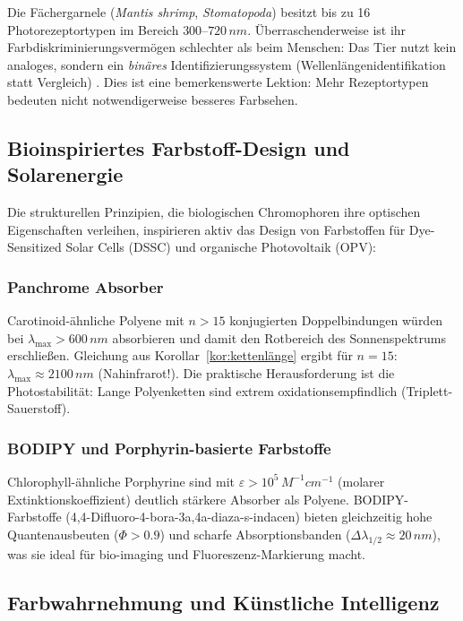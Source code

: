 ﻿\documentclass[a4paper,12pt]{article}
\theoremstyle{definition}
\begin{document}
Die Fächergarnele (\textit{Mantis shrimp}, \textit{Stomatopoda}) besitzt
bis zu 16 Photorezeptortypen im Bereich $300$--$720\,\si{nm}$.
Überraschenderweise ist ihr Farbdiskriminierungsvermögen schlechter
als beim Menschen: Das Tier nutzt kein analoges, sondern ein \emph{binäres}
Identifizierungssystem (Wellenlängenidentifikation statt Vergleich) \cite{thoen2014}.
Dies ist eine bemerkenswerte Lektion: Mehr Rezeptortypen bedeuten nicht
notwendigerweise besseres Farbsehen.

\subsection{Bioinspiriertes Farbstoff-Design und Solarenergie}

Die strukturellen Prinzipien, die biologischen Chromophoren ihre optischen
Eigenschaften verleihen, inspirieren aktiv das Design von Farbstoffen für
Dye-Sensitized Solar Cells (DSSC) und organische Photovoltaik (OPV):

\subsubsection{Panchrome Absorber}

Carotinoid-ähnliche Polyene mit $n > 15$ konjugierten Doppelbindungen
würden bei $\lambda_{\max} > 600\,\si{nm}$ absorbieren und damit den Rotbereich
des Sonnenspektrums erschließen. Gleichung aus Korollar~\ref{kor:kettenlänge}
ergibt für $n=15$: $\lambda_{\max} \approx 2100\,\si{nm}$ (Nahinfrarot!).
Die praktische Herausforderung ist die Photostabilität: Lange Polyenketten
sind extrem oxidationsempfindlich (Triplett-Sauerstoff).

\subsubsection{BODIPY und Porphyrin-basierte Farbstoffe}

Chlorophyll-ähnliche Porphyrine sind mit $\varepsilon > 10^5\,\si{M^{-1}cm^{-1}}$
(molarer Extinktionskoeffizient) deutlich stärkere Absorber als Polyene.
BODIPY-Farbstoffe (4,4-Difluoro-4-bora-3a,4a-diaza-s-indacen) bieten
gleichzeitig hohe Quantenausbeuten ($\Phi > 0.9$) und scharfe Absorptionsbanden
($\Delta\lambda_{1/2} \approx 20\,\si{nm}$), was sie ideal für bio-imaging
und Fluoreszenz-Markierung macht.

\subsection{Farbwahrnehmung und Künstliche Intelligenz}
\end{document}
